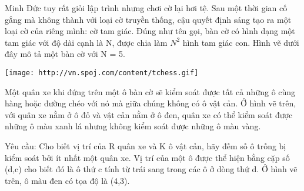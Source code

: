 Minh Đức tuy rất giỏi lập trình nhưng chơi cờ lại hơi tệ. Sau một thời gian cố gắng mà không thành với loại cờ truyền thống, cậu quyết định sáng tạo ra một loại cờ của riêng mình: cờ tam giác. Đúng như tên gọi, bàn cờ có hình dạng một tam giác với độ dài cạnh là N, được chia làm $N^{2}$   hình tam giác con. Hình vẽ dưới đây mô tả một bàn cờ với N = 5.  


\texttt{[image: http://vn.spoj.com/content/tchess.gif]}

   Một quân xe khi đứng trên một ô bàn cờ sẽ kiểm soát được tất cả những ô cùng hàng hoặc đường chéo với nó mà giữa chúng không có ô vật cản. Ở hình vẽ trên, với quân xe nằm ở ô đỏ và vật cản nằm ở ô đen, quân xe có thể kiểm soát được những ô màu xanh lá nhưng không kiểm soát được những ô màu vàng.   


   Yêu cầu: Cho biết vị trí của R quân xe và K ô vật cản, hãy đếm số ô trống bị kiểm soát bởi ít nhất một quân xe. Vị trí của một ô được thể hiện bằng cặp số (d,c) cho biết đó là ô thứ c tính từ trái sang trong các ô ở dòng thứ d. Ở hình vẽ trên, ô màu đen có tọa độ là (4,3).